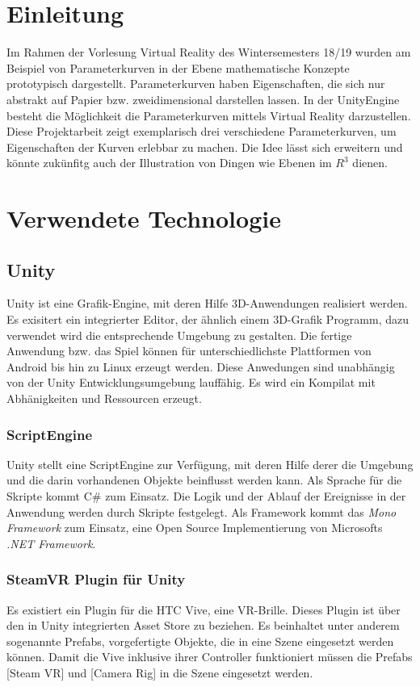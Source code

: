 
\chapter{Einleitung}
\label{Einleitung}

Im Rahmen der Vorlesung Virtual Reality des Wintersemesters 18/19 wurden am Beispiel von Parameterkurven in der Ebene mathematische Konzepte prototypisch dargestellt.
Parameterkurven haben Eigenschaften, die sich nur abstrakt auf Papier bzw. zweidimensional darstellen lassen.
In der UnityEngine besteht die Möglichkeit die Parameterkurven mittels Virtual Reality darzustellen.  
Diese Projektarbeit zeigt exemplarisch drei verschiedene Parameterkurven, um Eigenschaften der Kurven erlebbar zu machen. 
Die Idee lässt sich erweitern und könnte zukünfitg auch der Illustration von Dingen wie Ebenen im $R^{3}$ dienen.

\chapter{Verwendete Technologie}
\label{Technologie}
\section{Unity}
Unity ist eine Grafik-Engine, mit deren Hilfe 3D-Anwendungen realisiert werden. Es exisitert ein integrierter Editor, der ähnlich einem 3D-Grafik Programm, dazu verwendet wird die entsprechende Umgebung zu gestalten. Die fertige Anwendung bzw. das Spiel können für unterschiedlichste Plattformen von Android bis hin zu Linux erzeugt werden. Diese Anwedungen sind unabhängig von der Unity Entwicklungsumgebung lauffähig. Es wird ein Kompilat mit Abhänigkeiten und Ressourcen erzeugt.

\subsection{ScriptEngine}
Unity stellt eine ScriptEngine zur Verfügung, mit deren Hilfe derer die Umgebung und die darin vorhandenen Objekte beinflusst werden kann. Als Sprache für die Skripte kommt C\# zum Einsatz. Die Logik und der Ablauf der Ereignisse in der Anwendung werden durch Skripte festgelegt. Als Framework kommt das \emph{Mono Framework} zum Einsatz, eine Open Source Implementierung von Microsofts \emph{.NET Framework}.

\subsection{SteamVR Plugin für Unity}
Es existiert ein Plugin für die HTC Vive, eine VR-Brille. Dieses Plugin ist über den in Unity integrierten Asset Store zu beziehen. Es beinhaltet unter anderem sogenannte Prefabs, vorgefertigte Objekte, die in eine Szene eingesetzt werden können. Damit die Vive inklusive ihrer Controller funktioniert müssen die Prefabs [Steam VR] und [Camera Rig] in die Szene eingesetzt werden. 


